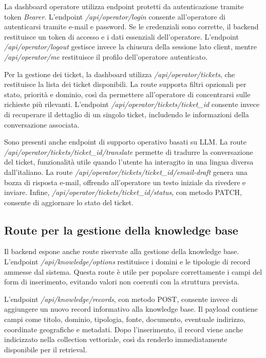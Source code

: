 La dashboard operatore utilizza endpoint protetti da autenticazione tramite token \textit{Bearer}. L’endpoint \textit{/api/operator/login} consente all’operatore di autenticarsi tramite e-mail e password. Se le credenziali sono corrette, il backend restituisce un token di accesso e i dati essenziali dell’operatore. L’endpoint \textit{/api/operator/logout} gestisce invece la chiusura della sessione lato client, mentre \textit{/api/operator/me} restituisce il profilo dell’operatore autenticato.

Per la gestione dei ticket, la dashboard utilizza \textit{/api/operator/tickets}, che restituisce la lista dei ticket disponibili. La route supporta filtri opzionali per stato, priorità e dominio, così da permettere all’operatore di concentrarsi sulle richieste più rilevanti. L’endpoint \textit{/api/operator/tickets/ticket\_id} consente invece di recuperare il dettaglio di un singolo ticket, includendo le informazioni della conversazione associata.

Sono presenti anche endpoint di supporto operativo basati su LLM. La route \textit{/api/operator/tickets/ticket\_id/translate} permette di tradurre la conversazione del ticket, funzionalità utile quando l’utente ha interagito in una lingua diversa dall’italiano. La route \textit{/api/operator/tickets/ticket\_id/email-draft} genera una bozza di risposta e-mail, offrendo all’operatore un testo iniziale da rivedere e inviare. Infine, \textit{/api/operator/tickets/ticket\_id/status}, con metodo PATCH, consente di aggiornare lo stato del ticket.

\subsection*{Route per la gestione della knowledge base}

Il backend espone anche route riservate alla gestione della knowledge base. L’endpoint \textit{/api/knowledge/options} restituisce i domini e le tipologie di record ammesse dal sistema. Questa route è utile per popolare correttamente i campi del form di inserimento, evitando valori non coerenti con la struttura prevista.

L’endpoint \textit{/api/knowledge/records}, con metodo POST, consente invece di aggiungere un nuovo record informativo alla knowledge base. Il payload contiene campi come titolo, dominio, tipologia, fonte, documento, eventuale indirizzo, coordinate geografiche e metadati. Dopo l’inserimento, il record viene anche indicizzato nella collection vettoriale, così da renderlo immediatamente disponibile per il retrieval.

